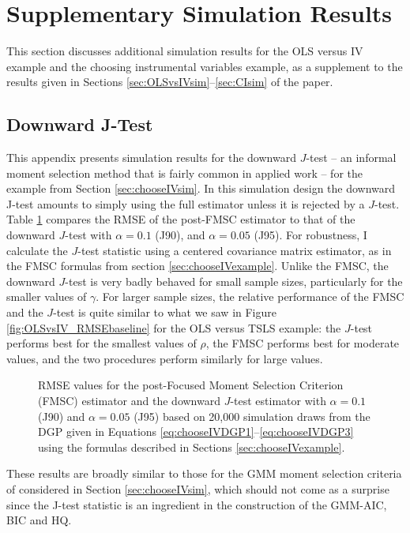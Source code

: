 \section{Supplementary Simulation Results}
\label{sec:simsupplement}
This section discusses additional simulation results for the OLS versus IV example and the choosing instrumental variables example, as a supplement to the results given in Sections \ref{sec:OLSvsIVsim}--\ref{sec:CIsim} of the paper.

\subsection{Downward J-Test}
\label{sec:downwardJ}
This appendix presents simulation results for the downward $J$-test -- an informal moment selection method that is fairly common in applied work -- for the example from Section \ref{sec:chooseIVsim}.
In this simulation design the downward J-test amounts to simply using the full estimator unless it is rejected by a $J$-test.
Table \ref{fig:chooseIVsim_RMSErelJ} compares the RMSE of the post-FMSC estimator to that of the downward $J$-test with $\alpha = 0.1$ (J90), and $\alpha = 0.05$ (J95).
For robustness, I calculate the $J$-test statistic using a centered covariance matrix estimator, as in the FMSC formulas from section \ref{sec:chooseIVexample}.
Unlike the FMSC, the downward $J$-test is very badly behaved for small sample sizes, particularly for the smaller values of $\gamma$.
For larger sample sizes, the relative performance of the FMSC and the $J$-test is quite similar to what we saw in Figure \ref{fig:OLSvsIV_RMSEbaseline} for the OLS versus TSLS example: the $J$-test performs best for the smallest values of $\rho$, the FMSC performs best for moderate values, and the two procedures perform similarly for large values.
\begin{figure}
\centering
	
	\caption{RMSE values for the post-Focused Moment Selection Criterion (FMSC) estimator and the downward $J$-test estimator with $\alpha = 0.1$ (J90) and $\alpha = 0.05$ (J95) based on 20,000 simulation draws from the DGP given in Equations \ref{eq:chooseIVDGP1}--\ref{eq:chooseIVDGP3} using the formulas described in Sections \ref{sec:chooseIVexample}.}
	\label{fig:chooseIVsim_RMSErelJ}
\end{figure}
These results are broadly similar to those for the GMM moment selection criteria of \cite{Andrews1999} considered in Section \ref{sec:chooseIVsim}, which should not come as a surprise since the J-test statistic is an ingredient in the construction of the GMM-AIC, BIC and HQ. 


